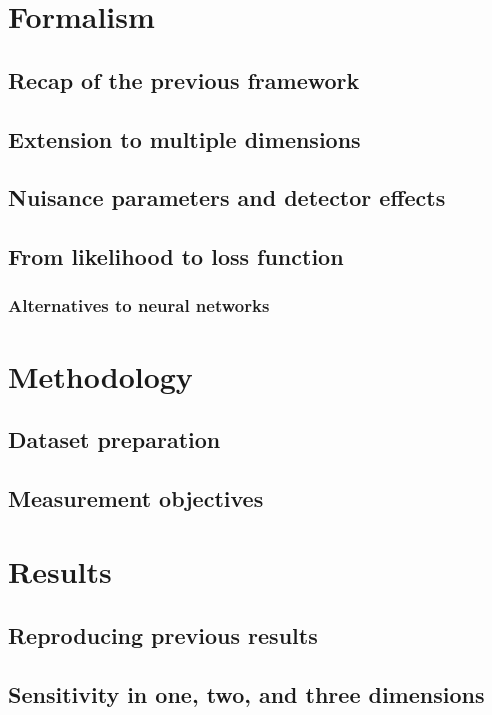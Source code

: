 \documentclass[aps,prd,reprint,groupedaddress]{revtex4-2}
\begin{document}
\section{Formalism}
\label{sec:rewrite-formalism}
\subsection{Recap of the previous framework}
\subsection{Extension to multiple dimensions}
\subsection{Nuisance parameters and detector effects}
\subsection{From likelihood to loss function}
\subsubsection{Alternatives to neural networks}

\section{Methodology}
\label{sec:rewrite-methodology}
\subsection{Dataset preparation}
\subsection{Measurement objectives}

\section{Results}
\label{sec:rewrite-results}
\subsection{Reproducing previous results}
\subsection{Sensitivity in one, two, and three dimensions}
\end{document}
